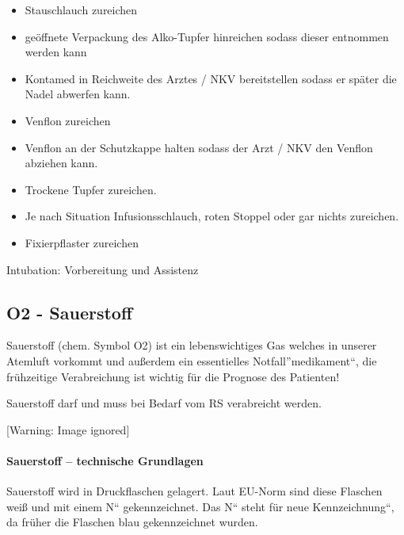 \documentclass{article}
\makeatletter
\newcommand\captionof[1]{\def\@captype{#1}\caption}
\makeatother
\begin{document}
\begin{itemize}
\item Stauschlauch zureichen

\item ge\"offnete Verpackung des Alko-Tupfer hinreichen sodass dieser
entnommen werden kann

\item Kontamed in Reichweite des  Arztes / NKV bereitstellen sodass er
sp\"ater die Nadel abwerfen kann.

\item Venflon zureichen

\end{itemize}
\begin{itemize}
\item Venflon an der Schutzkappe halten sodass der Arzt / NKV den
Venflon abziehen kann.

\end{itemize}
\begin{itemize}
\item Trockene Tupfer zureichen.

\item Je nach Situation Infusionsschlauch, roten Stoppel oder gar nichts
zureichen.  

\item Fixierpflaster zureichen

\end{itemize}
Intubation: Vorbereitung und Assistenz 

\subsection[O2 \ - Sauerstoff]{O2  {}- Sauerstoff}
Sauerstoff (chem. Symbol O2) ist ein lebenswichtiges Gas welches in
unserer Atemluft vorkommt und au{\ss}erdem ein essentielles
Notfall{\textquotedblright}medikament{\textquotedblleft}, die
fr\"uhzeitige Verabreichung ist wichtig f\"ur die Prognose des
Patienten!

Sauerstoff darf und muss bei Bedarf vom RS verabreicht werden.

\begin{center}
 [Warning: Image ignored] %
\captionof{figure}[: NEIN!]{: NEIN!}

\end{center}
\paragraph{Sauerstoff -- technische Grundlagen}
Sauerstoff wird in Druckflaschen  gelagert. Laut EU-Norm sind diese
Flaschen wei{\ss} und mit einem {\quotedblbase}N{\textquotedblleft}
gekennzeichnet. Das {\quotedblbase}N{\textquotedblleft} steht f\"ur
{\quotedblbase}neue Kennzeichnung{\textquotedblleft}, da fr\"uher die
Flaschen blau gekennzeichnet wurden. 
\end{document}
